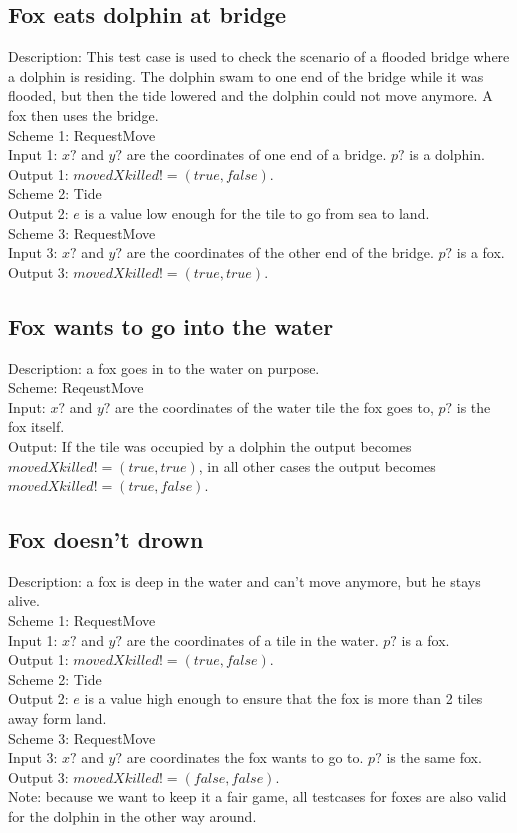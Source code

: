 \documentclass[a4paper,11pt]{article}
\begin{document}
    \subsection{Fox eats dolphin at bridge}
    Description: This test case is used to check the scenario of a flooded bridge where a dolphin is residing. The dolphin swam to one end of the bridge while it was flooded, but then the tide lowered and the dolphin could not move anymore. A fox then uses the bridge.\\
    Scheme 1: RequestMove\\
    Input 1: $x?$ and $y?$ are the coordinates of one end of a bridge. $p?$ is a dolphin.\\
    Output 1: $movedXkilled! = (true,false)$.\\
    Scheme 2: Tide\\
    Output 2: $e$ is a value low enough for the tile to go from sea to land.\\
    Scheme 3: RequestMove\\
    Input 3: $x?$ and $y?$ are the coordinates of the other end of the bridge. $p?$ is a fox.\\
    Output 3: $movedXkilled! = (true,true)$.\\
    
    \subsection{Fox wants to go into the water}
    Description: a fox goes in to the water on purpose.\\
    Scheme: ReqeustMove\\
    Input: $x?$ and $y?$ are the coordinates of the water tile the fox goes to, $p?$ is the fox itself.\\
    Output: If the tile was occupied by a dolphin the output becomes $movedXkilled! = (true,true)$, in all other cases the output becomes $movedXkilled! = (true,false)$.

    \subsection{Fox doesn't drown}
    Description: a fox is deep in the water and can't move anymore, but he stays alive.\\
    Scheme 1: RequestMove\\
    Input 1: $x?$ and $y?$ are the coordinates of a tile in the water. $p?$ is a fox.\\
    Output 1: $movedXkilled! = (true,false)$.\\
    Scheme 2: Tide\\
    Output 2: $e$ is a value high enough to ensure that the fox is more than 2 tiles away form land.\\
    Scheme 3: RequestMove\\
    Input 3: $x?$ and $y?$ are coordinates the fox wants to go to. $p?$ is the same fox.\\
    Output 3: $movedXkilled! = (false,false)$.\\


    Note: because we want to keep it a fair game, all testcases for foxes are also valid for the dolphin in the other way around.\\
\end{document}

